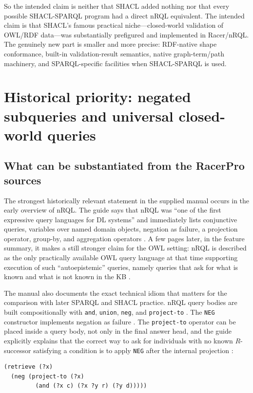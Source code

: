 \documentclass[11pt,letterpaper]{article}
\newcommand{\nrql}{nRQL}
\newcommand{\shacl}{SHACL}
\newcommand{\naf}{negation as failure}
\newcommand{\owl}{OWL}
\begin{document}
So the intended claim is neither that SHACL added nothing nor that every possible SHACL-SPARQL program had a direct nRQL equivalent. The intended claim is that SHACL's famous practical niche---closed-world validation of OWL/RDF data---was substantially prefigured and implemented in Racer/nRQL. The genuinely new part is smaller and more precise: RDF-native shape conformance, built-in validation-result semantics, native graph-term/path machinery, and SPARQL-specific facilities when SHACL-SPARQL is used.


\section{Historical priority: negated subqueries and universal closed-world queries}

\subsection{What can be substantiated from the RacerPro sources}

The strongest historically relevant statement in the supplied manual occurs in the early overview of \nrql{}. The guide says that \nrql{} was ``one of the first expressive query languages for DL systems'' and immediately lists conjunctive queries, variables over named domain objects, \naf{}, a projection operator, group-by, and aggregation operators \cite[p.~4]{racerug}. A few pages later, in the feature summary, it makes a still stronger claim for the \owl{} setting: \nrql{} is described as the only practically available \owl{} query language at that time supporting execution of such ``autoepistemic'' queries, namely queries that ask for what is known and what is not known in the KB \cite[p.~82]{racerug}.

The manual also documents the exact technical idiom that matters for the comparison with later SPARQL and \shacl{} practice. \nrql{} query bodies are built compositionally with \texttt{and}, \texttt{union}, \texttt{neg}, and \texttt{project-to} \cite[pp.~81--82]{racerug}. The \texttt{NEG} constructor implements \naf{} \cite[pp.~113--117]{racerug}. The \texttt{project-to} operator can be placed inside a query body, not only in the final answer head, and the guide explicitly explains that the correct way to ask for individuals with no known $R$-successor satisfying a condition is to apply \texttt{NEG} after the internal projection \cite[pp.~119--120]{racerug}:

\begin{lstlisting}[language=nrql,caption={nRQL negated projected query body, i.e. an anti-existential subquery.}]
(retrieve (?x)
  (neg (project-to (?x)
         (and (?x c) (?x ?y r) (?y d)))))
\end{lstlisting}
\end{document}
